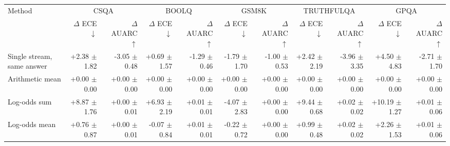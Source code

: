 \begin{tabular}{lrrrrrrrrrr}
\toprule
Method & \multicolumn{2}{c}{CSQA} & \multicolumn{2}{c}{BOOLQ} & \multicolumn{2}{c}{GSM8K} & \multicolumn{2}{c}{TRUTHFULQA} & \multicolumn{2}{c}{GPQA} \\
 & $\Delta$ ECE $\downarrow$ & $\Delta$ AUARC $\uparrow$ & $\Delta$ ECE $\downarrow$ & $\Delta$ AUARC $\uparrow$ & $\Delta$ ECE $\downarrow$ & $\Delta$ AUARC $\uparrow$ & $\Delta$ ECE $\downarrow$ & $\Delta$ AUARC $\uparrow$ & $\Delta$ ECE $\downarrow$ & $\Delta$ AUARC $\uparrow$ \\
\midrule
Single stream, same answer & +2.38 {\scriptsize $\pm$ 1.82} & -3.05 {\scriptsize $\pm$ 0.48} & +0.69 {\scriptsize $\pm$ 1.57} & -1.29 {\scriptsize $\pm$ 0.46} & -1.79 {\scriptsize $\pm$ 1.70} & -1.00 {\scriptsize $\pm$ 0.53} & +2.42 {\scriptsize $\pm$ 2.19} & -3.96 {\scriptsize $\pm$ 3.35} & +4.50 {\scriptsize $\pm$ 4.83} & -2.71 {\scriptsize $\pm$ 1.70} \\
Arithmetic mean & +0.00 {\scriptsize $\pm$ 0.00} & +0.00 {\scriptsize $\pm$ 0.00} & +0.00 {\scriptsize $\pm$ 0.00} & +0.00 {\scriptsize $\pm$ 0.00} & +0.00 {\scriptsize $\pm$ 0.00} & +0.00 {\scriptsize $\pm$ 0.00} & +0.00 {\scriptsize $\pm$ 0.00} & +0.00 {\scriptsize $\pm$ 0.00} & +0.00 {\scriptsize $\pm$ 0.00} & +0.00 {\scriptsize $\pm$ 0.00} \\
Log-odds sum & +8.87 {\scriptsize $\pm$ 1.76} & +0.00 {\scriptsize $\pm$ 0.01} & +6.93 {\scriptsize $\pm$ 2.19} & +0.01 {\scriptsize $\pm$ 0.01} & -4.07 {\scriptsize $\pm$ 2.83} & +0.00 {\scriptsize $\pm$ 0.00} & +9.44 {\scriptsize $\pm$ 0.68} & +0.02 {\scriptsize $\pm$ 0.02} & +10.19 {\scriptsize $\pm$ 1.27} & +0.01 {\scriptsize $\pm$ 0.06} \\
Log-odds mean & +0.76 {\scriptsize $\pm$ 0.87} & +0.00 {\scriptsize $\pm$ 0.01} & -0.07 {\scriptsize $\pm$ 0.84} & +0.01 {\scriptsize $\pm$ 0.01} & -0.22 {\scriptsize $\pm$ 0.72} & +0.00 {\scriptsize $\pm$ 0.00} & +0.99 {\scriptsize $\pm$ 0.48} & +0.02 {\scriptsize $\pm$ 0.02} & +2.26 {\scriptsize $\pm$ 1.53} & +0.01 {\scriptsize $\pm$ 0.06} \\

\end{tabular}
